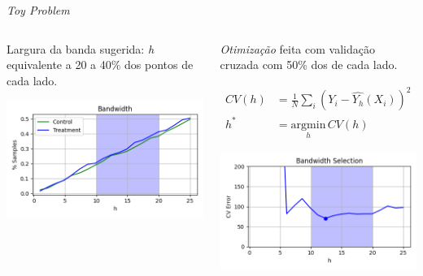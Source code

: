 \documentclass[aspectratio=1610, 10pt]{beamer}
\begin{document}
\begin{frame}{\emph{Toy Problem}}
    \begin{columns}[T] %
		\begin{column}{0.48\linewidth} %
            Largura da banda sugerida: \emph{h} equivalente a 20 a 40\% dos pontos de cada lado.

            \includegraphics[width=\linewidth]{toy/Bandwidth.png}
		\end{column}
		\begin{column}{0.48\linewidth}
            \emph{Otimização} feita com validação cruzada com 50\% dos de cada lado.

            \begin{align*}
                CV(h) &= \frac{1}{N} \sum_{i}{(Y_i - \hat{Y_h}(X_i))^2} \\
                h^* &= \underset{h}{\mathrm{argmin}} \, CV(h)
            \end{align*}

            \includegraphics[width=\linewidth]{toy/BandwidthSelection.png}

        \end{column}
	\end{columns}
\end{frame}
\end{document}
